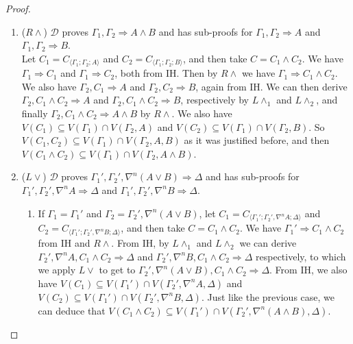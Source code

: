 \documentclass[12pt,a4paper]{article}
\theoremstyle{plain}
\theoremstyle{definition}
\begin{document}
\begin{proof}
\begin{enumerate}
	\item ($R\land$) $\mathcal{D}$ proves $\Gamma_1 , \Gamma_2 \Rightarrow A \land B$ and has sub-proofs for $\Gamma_1 , \Gamma_2 \Rightarrow A$ and $\Gamma_1 , \Gamma_2 \Rightarrow B$.\\
	Let $C_1 = C_{\langle\Gamma_1;\Gamma_2;A\rangle}$ and $C_2 = C_{\langle\Gamma_1;\Gamma_2;B\rangle}$, and then take $C = C_1 \land C_2$.
	We have $\Gamma_1 \Rightarrow C_1$ and $\Gamma_1 \Rightarrow C_2$, both from IH. Then by $R\land$ we have $\Gamma_1 \Rightarrow C_1 \land C_2$.
	We also have $\Gamma_2 , C_1 \Rightarrow A$ and $\Gamma_2 , C_2 \Rightarrow B$, again from IH.
	We can then derive $\Gamma_2 , C_1 \land C_2 \Rightarrow A$ and $\Gamma_2 , C_1 \land C_2 \Rightarrow B$, respectively by $L\land_1$ and $L\land_2$, and finally  $\Gamma_2 , C_1 \land C_2 \Rightarrow A \land B$ by $R\land$.
	We also have $V(C_1) \subseteq V(\Gamma_1) \cap V(\Gamma_2 , A)$ and $V(C_2) \subseteq V(\Gamma_1) \cap V(\Gamma_2 , B)$. So $V(C_1 , C_2) \subseteq V(\Gamma_1) \cap V(\Gamma_2 , A , B)$ as it was justified before, and then $V(C_1 \land C_2) \subseteq V(\Gamma_1) \cap V(\Gamma_2 , A \land B)$.
	
	\item ($L\lor$) $\mathcal{D}$ proves $\Gamma_1' , \Gamma_2' , \nabla^n (A \lor B) \Rightarrow \Delta$ and has sub-proofs for $\Gamma_1' , \Gamma_2' , \nabla^n A \Rightarrow \Delta$ and $\Gamma_1' , \Gamma_2' , \nabla^n B \Rightarrow \Delta$.
	\begin{enumerate}
		\item If $\Gamma_1 = \Gamma_1'$ and $\Gamma_2 = \Gamma_2' , \nabla^n (A \lor B)$, let $C_1 = C_{\langle\Gamma_1';\Gamma_2',\nabla^n A;\Delta\rangle}$ and $C_2 = C_{\langle\Gamma_1';\Gamma_2',\nabla^n B;\Delta\rangle}$, and then take $C = C_1 \land C_2$.
		We have $\Gamma_1' \Rightarrow C_1 \land C_2$ from IH and $R\land$.
		From IH, by $L\land_1$ and $L\land_2$ we can derive $\Gamma_2' , \nabla^n A , C_1 \land C_2 \Rightarrow \Delta$ and $\Gamma_2' , \nabla^n B , C_1 \land C_2 \Rightarrow \Delta$ respectively, to which we apply $L\lor$ to get to $\Gamma_2' , \nabla^n (A \lor B) , C_1 \land C_2 \Rightarrow \Delta$.
		From IH, we also have $V(C_1) \subseteq V(\Gamma_1') \cap V(\Gamma_2' , \nabla^n A , \Delta)$ and $V(C_2) \subseteq V(\Gamma_1') \cap V(\Gamma_2' , \nabla^n B , \Delta)$. Just like the previous case, we can deduce that $V(C_1 \land C_2) \subseteq V(\Gamma_1') \cap V(\Gamma_2' , \nabla^n (A \land B) , \Delta)$.


\end{enumerate}
\end{enumerate}
\end{proof}
\end{document}
